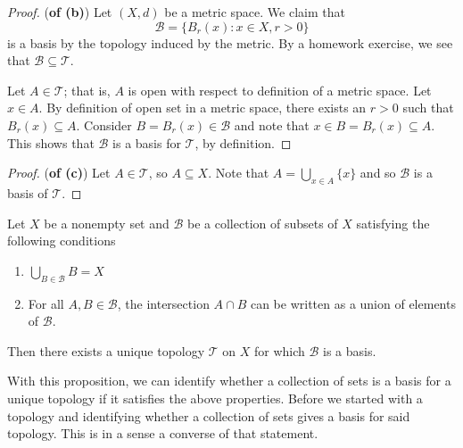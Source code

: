 \begin{proof}
    (\textbf{of (b)}) Let \( (X,d) \) be a metric space. We claim that 
    \[  \mathcal{B} = \{  {B}_{r}(x) : x \in X , r > 0  \}  \]
    is a basis by the topology induced by the metric. By a homework exercise, we see that \( \mathcal{B} \subseteq  \mathcal{T} \).

    Let \( A \in \mathcal{T} \); that is, \( A  \) is open with respect to definition of a metric space. Let \( x \in A  \). By definition of open set in a metric space, there exists an \( r > 0  \) such that \( {B}_{r}(x) \subseteq A \). Consider \( B = {B}_{r}(x) \in \mathcal{B} \) and note that \( x \in B = {B}_{r}(x) \subseteq A \). This shows that \( \mathcal{B} \) is a basis for \( \mathcal{T} \), by definition. 
\end{proof}

\begin{proof}
    (\textbf{of (c)}) Let \( A \in \mathcal{T} \), so \( A \subseteq X  \). Note that \( A = \bigcup_{ x \in A  }^{  }  \{  x  \}  \) and so \( \mathcal{B} \) is a basis of \( \mathcal{T} \).
\end{proof}


\begin{prop}
    Let \( X  \) be a nonempty set and \( \mathcal{B} \) be a collection of subsets of \( X  \) satisfying the following conditions
    \begin{enumerate}
        \item[(1)] \( \bigcup_{ B \in \mathcal{B} }^{  } B  = X \)
        \item[(2)] For all \( A,B \in \mathcal{B} \), the intersection \( A \cap B  \) can be written as a union of elements of \( \mathcal{B} \).
    \end{enumerate}
    Then there exists a unique topology \( \mathcal{T} \) on \( X  \) for which \( \mathcal{B} \) is a basis.
\end{prop}

With this proposition, we can identify whether a collection of sets is a basis for a unique topology if it satisfies the above properties. Before we started with a topology and identifying whether a collection of sets gives a basis for said topology. This is in a sense a converse of that statement.

